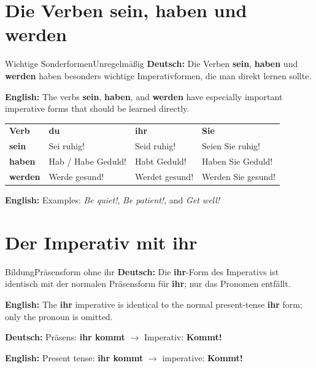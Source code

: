 \documentclass[a4paper,11pt]{article}
\newcommand{\GermanText}[1]{\textbf{Deutsch: }#1\par}
\newcommand{\EnglishText}[1]{{\small\color{SoftGray}\textbf{English: }#1\par}}
\newcommand{\TableEnglish}[1]{{\small\color{SoftGray}\textbf{English: }#1\par}}
\begin{document}
    \section{Die Verben sein, haben und werden}

        \begin{grammarentry}{Wichtige Sonderformen}{Unregelmäßig}
            \GermanText{Die Verben \textbf{sein}, \textbf{haben} und \textbf{werden} haben besonders wichtige Imperativformen, die man direkt lernen sollte.}
            \EnglishText{The verbs \textbf{sein}, \textbf{haben}, and \textbf{werden} have especially important imperative forms that should be learned directly.}
        \end{grammarentry}

        \begin{longtable}{>{\bfseries}p{2.5cm}|p{3.5cm}|p{3.7cm}|p{4.8cm}}
            \rowcolor{HeaderBlueDark}
            \color{white}\textbf{Verb} &
            \color{white}\textbf{du} &
            \color{white}\textbf{ihr} &
            \color{white}\textbf{Sie} \\
            sein & Sei ruhig! & Seid ruhig! & Seien Sie ruhig! \\
            haben & Hab / Habe Geduld! & Habt Geduld! & Haben Sie Geduld! \\
            werden & Werde gesund! & Werdet gesund! & Werden Sie gesund! \\
        \end{longtable}
        \TableEnglish{Examples: \textit{Be quiet!}, \textit{Be patient!}, and \textit{Get well!}}

    \section{Der Imperativ mit ihr}

        \begin{grammarentry}{Bildung}{Präsensform ohne ihr}
            \GermanText{Die \textbf{ihr}-Form des Imperativs ist identisch mit der normalen Präsensform für \textbf{ihr}; nur das Pronomen entfällt.}
            \EnglishText{The \textbf{ihr} imperative is identical to the normal present-tense \textbf{ihr} form; only the pronoun is omitted.}

            \GermanText{Präsens: \textbf{ihr kommt} $\rightarrow$ Imperativ: \textbf{Kommt!}}
            \EnglishText{Present tense: \textbf{ihr kommt} $\rightarrow$ imperative: \textbf{Kommt!}}
        \end{grammarentry}
\end{document}
